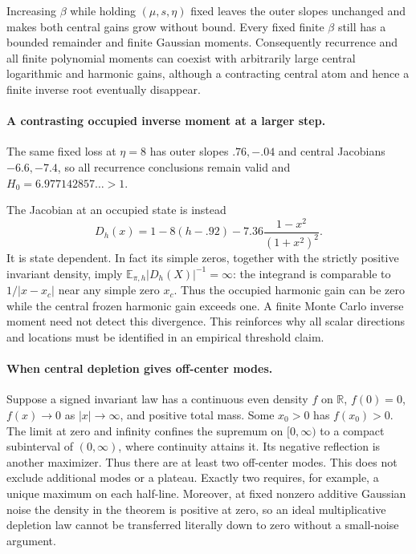Increasing \(\beta\) while holding \((\mu,s,\eta)\) fixed leaves the
outer slopes unchanged and makes both central gains grow without bound.
Every fixed finite \(\beta\) still has a bounded remainder and finite
Gaussian moments. Consequently recurrence and all finite polynomial
moments can coexist with arbitrarily large central logarithmic and
harmonic gains, although a contracting central atom and hence a finite
inverse root eventually disappear.

\paragraph{A contrasting occupied inverse moment at a larger step.}
The same fixed loss at \(\eta=8\) has outer slopes \(.76,-.04\) and
central Jacobians \(-6.6,-7.4\), so all recurrence conclusions remain
valid and \(H_0=6.977142857\ldots>1\).

The Jacobian at an occupied state is instead
\[
 D_h(x)=1-8(h-.92)-7.36\frac{1-x^2}{(1+x^2)^2}.
\]
It is state dependent. In fact its simple zeros, together with the
strictly positive invariant density, imply
\(\mathbb E_{\pi,h}|D_h(X)|^{-1}=\infty\): the integrand is comparable
to \(1/|x-x_c|\) near any simple zero \(x_c\).
Thus the occupied harmonic gain can be zero while the central frozen
harmonic gain exceeds one. A finite Monte Carlo inverse moment need not
detect this divergence. This reinforces why all scalar directions and
locations must be identified in an empirical threshold claim.

\paragraph{When central depletion gives off-center modes.}
Suppose a signed invariant law has a continuous even density \(f\) on
\(\mathbb R\), \(f(0)=0\), \(f(x)\to0\) as \(|x|\to\infty\), and
positive total mass. Some \(x_0>0\) has \(f(x_0)>0\). The limit at zero
and infinity confines the supremum on \([0,\infty)\) to a compact
subinterval of \((0,\infty)\), where continuity attains it. Its negative
reflection is another maximizer. Thus there are at least two off-center
modes. This does not exclude additional modes or a plateau. Exactly two
requires, for example, a unique maximum on each half-line. Moreover,
at fixed nonzero additive Gaussian noise the density in the theorem is
positive at zero, so an ideal multiplicative depletion law cannot be
transferred literally down to zero without a small-noise argument.


